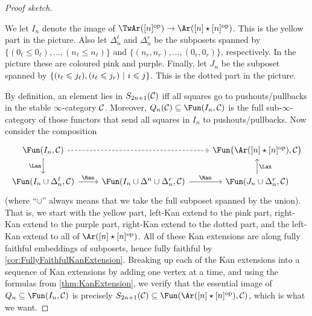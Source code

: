 \documentclass[a4paper, 10pt, oneside, DIV=9, chapterprefix=true, numbers=enddot,bibliography=totoc]{scrbook}
\begin{document}
\begin{proof}[Proof sketch]
\begin{center}
	\end{center}
	We let $I_n$ denote the image of $\TwAr([n]^\op)\morphism \Ar([n]\star[n]^\op)$. This is the yellow part in the picture. Also let $\Delta_n^\ell$ and $\Delta_n^r$ be the subposets spanned by $\{(0_\ell\leq 0_\ell),\dotsc,(n_\ell\leq n_\ell)\}$ and $\{(n_r,n_r),\dotsc,(0_r,0_r)\}$, respectively. In the picture these are coloured pink and purple. Finally, let $J_n$ be the subposet spanned by $\left\{(i_\ell\leqslant j_\ell), (i_\ell\leqslant j_r)\ \middle|\  i\leqslant j\right\}$. This is the dotted part in the picture.
	
	By definition, an element lies in $S_{2n+1}(\mathcal{C})$ iff all squares go to pushouts/pullbacks in the stable $\infty$-category $\mathcal{C}$. Moreover, $Q_n(\Cc)\subseteq \Fun(I_n,\Cc)$ is the full sub-$\infty$-category of those functors that send all squares in $I_n$ to pushouts/pullbacks. Now consider the composition
	\begin{equation*}
		\begin{tikzcd}
			\Fun(I_n,\Cc)\dar["\Lan"']\ar[rr,dashed] & &\Fun\big(\Ar([n]\star [n]^\op),\Cc\big)\\
			 \Fun(I_n\cup\Delta_n^\ell,\Cc)\rar["\Ran"] & \Fun(I_n\cup\Delta^n\cup\Delta_n^r,\Cc)\rar["\Ran"] & \Fun(J_n\cup\Delta_n^r,\Cc)\uar["\Lan"']
		\end{tikzcd}
	\end{equation*}
	(where \enquote{$\cup$} always means that we take the full subposet spanned by the union). That is, we start with the yellow part, left-Kan extend to the pink part, right-Kan extend to the purple part, right-Kan extend to the dotted part, and the left-Kan extend to all of $\Ar([n]\star [n]^\op)$. All of these Kan extensions are along fully faithful embeddings of subposets, hence fully faithful by \cref{cor:FullyFaithfulKanExtension}. Breaking up each of the Kan extensions into a sequence of Kan extensions by adding one vertex at a time, and using the formulas from \cref{thm:KanExtension}, we verify that the essential image of $Q_n\subseteq \Fun(I_n,\Cc)$ is precisely $S_{2n+1}(\Cc)\subseteq \Fun(\Ar([n]\star [n]^\op),\Cc)$, which is what we want.
	

\end{proof}
\end{document}
